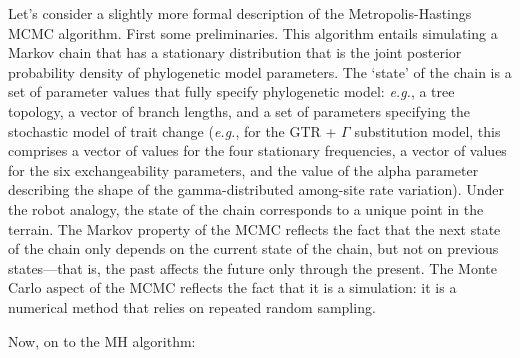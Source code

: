 \documentclass[11pt]{article}
\begin{document}
Let’s consider a slightly more formal description of the Metropolis-Hastings MCMC algorithm. 
First some preliminaries. 
This algorithm entails simulating a Markov chain that has a stationary distribution that is the joint posterior probability density of phylogenetic model parameters. 
The `state’ of the chain is a set of parameter values that fully specify phylogenetic model: {\it e.g.}, a tree topology, a vector of branch lengths, and a set of parameters specifying the stochastic model of trait change ({\it e.g.}, for the GTR + $\Gamma$ substitution model, this comprises a vector of values for the four stationary frequencies, a vector of values for the six exchangeability parameters, and the value of the alpha parameter describing the shape of the gamma-distributed among-site rate variation). 
Under the robot analogy, the state of the chain corresponds to a unique point in the terrain. 
The Markov property of the MCMC reflects the fact that the next state of the chain only depends on the current state of the chain, but not on previous states---that is, the past affects the future only through the present. 
The Monte Carlo aspect of the MCMC reflects the fact that it is a simulation: it is a numerical method that relies on repeated random sampling.

Now, on to the MH algorithm:
\end{document}

